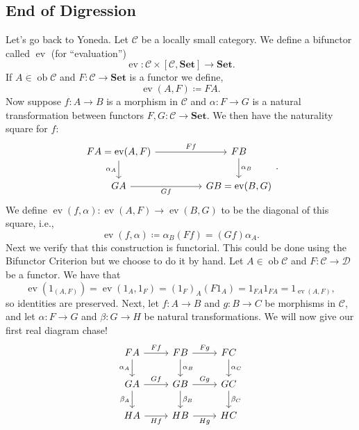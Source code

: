 \documentclass{report}
\newcommand{\mbold}[1]{\mathrm{\mathbf{#1}}}
\DeclareMathOperator{\ev}{ev}
\DeclareMathOperator{\ob}{ob}
\theoremstyle{definition}
\theoremstyle{plain}
\theoremstyle{definition}
\begin{document}
		\subsection*{End of Digression}
		Let's go back to Yoneda. Let $\mathcal{C}$ be a locally small category. We define a bifunctor called $\ev$ (for ``evaluation'')
		\[
			\ev\colon \mathcal{C}\times[\mathcal{C},\mbold{Set}] \to \mbold{Set}.
		\]
		If $A\in\ob\mathcal{C}$ and $F\colon \mathcal{C}\to\mbold{Set}$ is a functor we define,
		\[
			\ev(A,F)\coloneqq FA.
		\] 
		Now suppose $f\colon A\to B$ is a morphism in $\mathcal{C}$ and $\alpha\colon F\to G$ is a natural transformation between functors $F,G\colon \mathcal{C}\to\mbold{Set}$. We then have the naturality square for $f$:
		\[\begin{tikzcd}
			{FA = \ev(A,F)} && FB \\
			GA && {GB=\ev(B,G)}
			\arrow["Ff", from=1-1, to=1-3]
			\arrow["Gf"', from=2-1, to=2-3]
			\arrow["{\alpha_A}"', from=1-1, to=2-1]
			\arrow["{\alpha_B}", from=1-3, to=2-3]
		\end{tikzcd}.\]
		We define $\ev(f,\alpha)\colon \ev(A,F) \to \ev(B,G)$ to be the diagonal of this square, i.e.,
		\[
			\ev(f,\alpha)\coloneqq \alpha_B(Ff) = (Gf)\alpha_A.
		\]
		Next we verify that this construction is functorial. This could be done using the Bifunctor Criterion but we choose to do it by hand. Let $A\in\ob\mathcal{C}$ and $F\colon\mathcal{C}\to \mathcal{D}$ be a functor. We have that
		\[
			\ev(1_{(A,F)}) = \ev(1_A,1_F) = (1_F)_A(F1_A) = 1_{FA}1_{FA} = 1_{\ev(A,F)},
		\]
		so identities are preserved. Next, let $f\colon A\to B$ and $g\colon B \to C$ be morphisms in $\mathcal{C}$, and let $\alpha\colon F\to G$ and $\beta\colon G\to H$ be natural transformations. We will now give our first real diagram chase!
		\[\begin{tikzcd}
			FA & FB & FC \\
			GA & GB & GC \\
			HA & HB & HC
			\arrow["Ff", from=1-1, to=1-2]
			\arrow["Fg", from=1-2, to=1-3]
			\arrow["{\alpha_A}"', from=1-1, to=2-1]
			\arrow["{\beta_A}"', from=2-1, to=3-1]
			\arrow["{\alpha_C}", from=1-3, to=2-3]
			\arrow["{\beta_C}", from=2-3, to=3-3]
			\arrow["{\alpha_B}", from=1-2, to=2-2]
			\arrow["Gf", from=2-1, to=2-2]
			\arrow["Gg", from=2-2, to=2-3]
			\arrow["{\beta_B}", from=2-2, to=3-2]
			\arrow["Hf"', from=3-1, to=3-2]
			\arrow["Hg"', from=3-2, to=3-3]
		\end{tikzcd}\]
\end{document}
